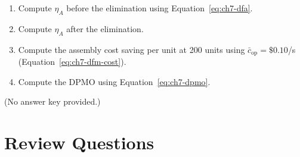 \begin{enumerate}
  \item[(a)] Compute $\eta_A$ before the elimination using
             Equation~\ref{eq:ch7-dfa}.
  \item[(b)] Compute $\eta_A$ after the elimination.
  \item[(c)] Compute the assembly cost saving per unit at 200 units using
             $\bar{c}_{\text{op}} = \$0.10$/s (Equation~\ref{eq:ch7-dfm-cost}).
  \item[(d)] Compute the DPMO using Equation~\ref{eq:ch7-dpmo}.
\end{enumerate}

\noindent(No answer key provided.)

\section*{Review Questions}

